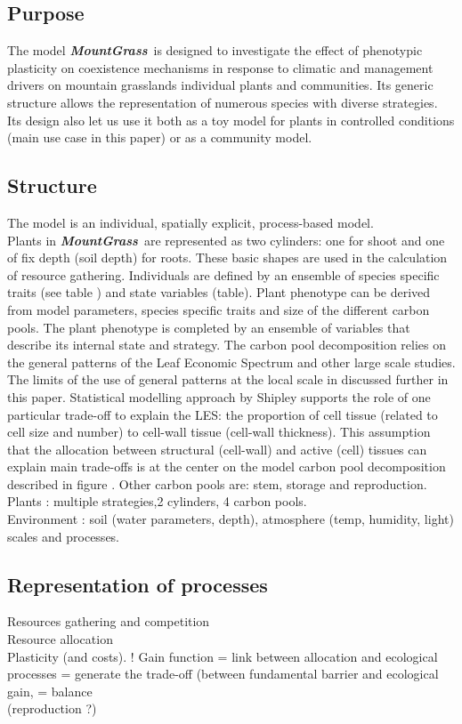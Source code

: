 \documentclass[review]{elsarticle}
\newcommand{\model}{\textbf{\textit{MountGrass}}~}
\begin{document}
\subsection{Purpose}
The model \model is designed to investigate the effect of phenotypic plasticity on coexistence mechanisms in response to climatic and management drivers on mountain grasslands individual plants and communities. Its generic structure allows the representation of numerous species with diverse strategies. Its design also let us use it both as a toy model for plants in controlled conditions (main use case in this paper) or as a community model.\\

\subsection{Structure}
The model is an individual, spatially explicit, process-based model.\\
Plants in \model are represented as two cylinders: one for shoot and one of fix depth (soil depth) for roots. These basic shapes are used in the calculation of resource gathering. Individuals are defined by an ensemble of species specific traits (see table ) and state variables (table). Plant phenotype can be derived from model parameters, species specific traits and size of the different carbon pools. The plant phenotype is completed by an ensemble of variables that describe its internal state and strategy. The carbon pool decomposition relies on the general patterns of the Leaf Economic Spectrum and other large scale studies. The limits of the use of general patterns at the local scale in discussed further in this paper. Statistical modelling approach by Shipley supports the role of one particular trade-off to explain the LES: the proportion of cell tissue (related to cell size and number) to cell-wall tissue (cell-wall thickness). This assumption that the allocation between structural (cell-wall) and active (cell) tissues can explain main trade-offs is at the center on the model carbon pool decomposition described in figure . Other carbon pools are: stem, storage and reproduction. %
Plants : multiple strategies,2 cylinders, 4 carbon pools.\\
Environment : soil (water parameters, depth), atmosphere (temp, humidity, light)\\
scales and processes.

\subsection{Representation of processes}
Resources gathering and competition\\
Resource allocation\\
Plasticity (and costs). ! Gain function = link between allocation and ecological processes = generate the trade-off (between fundamental barrier and ecological gain, = balance\\
(reproduction ?)\\
\end{document}
